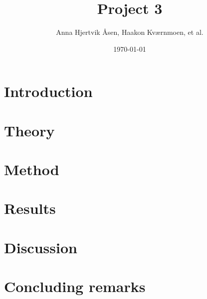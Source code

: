 \documentclass[twocolumn,english,notitlepage]{article}
\title{Project 3}
\author{Anna Hjertvik Åsen, Haakon Kværnmoen, et al.}
\date{\today}
\begin{document}

\tableofcontents

\section{Introduction}


\section{Theory}


\section{Method}


\section{Results}


\section{Discussion}


\section{Concluding remarks} 



\renewcommand{\theequation}{\thesection.\arabic{equation}}
\newpage
\begin{appendices}
     
\end{appendices}


\end{document}

